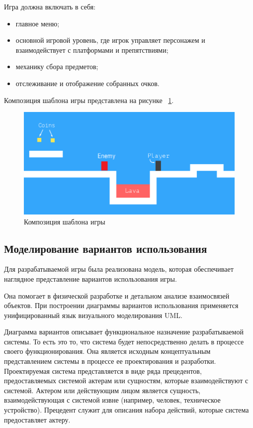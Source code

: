 Игра должна включать в себя:
\begin{itemize}
    \item главное меню;
    \item основной игровой уровень, где игрок управляет персонажем и взаимодействует с платформами и препятствиями;
    \item механику сбора предметов;
    \item отслеживание и отображение собранных очков.
\end{itemize}

Композиция шаблона игры представлена на рисунке ~\ref{fig:1}.
\begin{figure}[ht]
	\centering
	\includegraphics[width=1\linewidth]{images/Макет1}
	\caption{Композиция шаблона игры}
	\label{fig:1}
\end{figure}


\subsection{Моделирование вариантов использования}

Для разрабатываемой игры была реализована модель, которая обеспечивает наглядное представление вариантов использования игры.

Она помогает в физической разработке и детальном анализе взаимосвязей объектов. При построении диаграммы вариантов использования применяется унифицированный язык визуального моделирования UML.

Диаграмма вариантов описывает функциональное назначение разрабатываемой системы. То есть это то, что система будет непосредственно делать в процессе своего функционирования. Она является исходным концептуальным представлением системы в процессе ее проектирования и разработки. Проектируемая система представляется в виде ряда прецедентов, предоставляемых системой актерам или сущностям, которые взаимодействуют с системой. Актером или действующим лицом является сущность, взаимодействующая с системой извне (например, человек, техническое устройство). Прецедент служит для описания набора действий, которые система предоставляет актеру.

